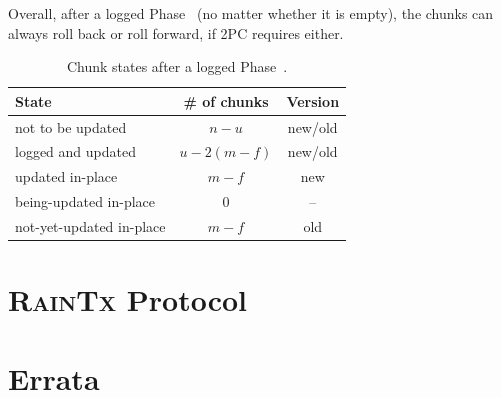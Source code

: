 \documentclass[letterpaper,10pt,twocolumn]{article}
\begin{document}
Overall, after a logged Phase~ (no matter whether it is empty), the
chunks can always roll back or roll forward, if 2PC requires either.

\begin{table}[!ht]
\centering
\begin{tabular}{l|c|c}
\hline
State & \# of chunks & Version \\
\hline
not to be updated & $n-u$ & new/old \\
logged and updated & $u - 2(m-f)$ & new/old \\
updated in-place & $m-f$ & new \\
being-updated in-place & $0$ & -- \\
not-yet-updated in-place & $m-f$ & old \\
\hline
\end{tabular}
\caption{Chunk states after a logged Phase~.}
\label{tab:states-2}
\end{table}



\section{\textsc{RainTx} Protocol}
\label{sec:raintx}

\section{Errata}
\label{sec:errata}
\end{document}
